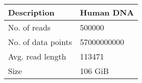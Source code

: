 	\begin{tabular}{|l|l|}
	\hline
	Description & Human DNA\\
        \hline
	No. of reads & \num{500000}\\
		No. of data points & \num{57000000000}\\
	Avg. read length & \num{113471}\\
    Size & 106 GiB\\
	\hline
    \end{tabular}
